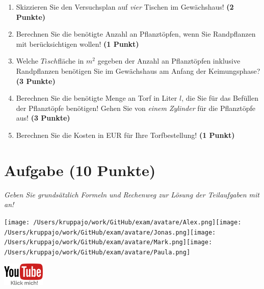 \documentclass[a4paper, 9pt]{scrartcl}\usepackage[]{graphicx}\usepackage[]{xcolor}
\begin{document}
\begin{enumerate}
\item Skizzieren Sie den Versuchsplan auf \textit{vier} Tischen im Gewächshaus! \textbf{(2 Punkte)}
\item Berechnen Sie die benötigte Anzahl an Pflanztöpfen, wenn Sie Randpflanzen mit berücksichtigen wollen! \textbf{(1 Punkt)}
\item Welche $Tisch$fläche in $m^2$ gegeben der Anzahl an Pflanztöpfen inklusive Randpflanzen benötigen Sie im Gewächshaus am Anfang der Keimungsphase?  \textbf{(3 Punkte)}
\item Berechnen Sie die benötigte Menge an Torf in Liter $l$, die Sie für das Befüllen der Pflanztöpfe benötigen! Gehen Sie von \textit{einem Zylinder} für die Pflanztöpfe aus!  \textbf{(3 Punkte)}
\item Berechnen Sie die Kosten in EUR für Ihre Torfbestellung! \textbf{(1 Punkt)}
\end{enumerate}



 
\clearpage

\section{Aufgabe \hfill (10 Punkte)}

\textit{Geben Sie grundsätzlich Formeln und Rechenweg zur Lösung der Teilaufgaben mit an!} \\[1Ex]
 

 
\begin{minipage}[t]{0.5\textwidth}
\texttt{[image: /Users/kruppajo/work/GitHub/exam/avatare/Alex.png]}\hspace{-4mm}\texttt{[image: /Users/kruppajo/work/GitHub/exam/avatare/Jonas.png]}\hspace{-4mm}\texttt{[image: /Users/kruppajo/work/GitHub/exam/avatare/Mark.png]}\hspace{-4mm}\texttt{[image: /Users/kruppajo/work/GitHub/exam/avatare/Paula.png]}
\end{minipage}
\begin{minipage}[t]{0.5\textwidth}
\hfill
\href{https://youtu.be/aBxLkdF-c4M}{\includegraphics[width = 2cm]{img/youtube}}
\end{minipage}
\end{document}
